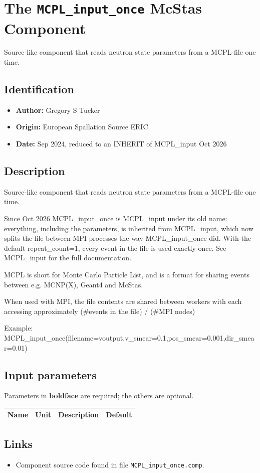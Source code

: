 \section{The \texttt{MCPL\_input\_once} McStas Component}
Source-like component that reads neutron state parameters from a MCPL-file one time.

\subsection*{Identification}
\begin{itemize}
  \item \textbf{Author:} Gregory S Tucker
  \item \textbf{Origin:} European Spallation Source ERIC
  \item \textbf{Date:} Sep 2024, reduced to an INHERIT of MCPL\_input Oct 2026
\end{itemize}

\subsection*{Description}
Source-like component that reads neutron state parameters from a MCPL-file one time.

Since Oct 2026 MCPL\_input\_once is MCPL\_input under its old name: everything, including the parameters, is inherited from MCPL\_input, which now splits the file between MPI processes the way MCPL\_input\_once did. With the default repeat\_count=1, every event in the file is used exactly once. See MCPL\_input for the full documentation.

MCPL is short for Monte Carlo Particle List, and is a format for sharing events between e.g. MCNP(X), Geant4 and McStas.

When used with MPI, the file contents are shared between workers with each accessing approximately (\#events in the file) / (\#MPI nodes)

Example: MCPL\_input\_once(filename=voutput,v\_smear=0.1,pos\_smear=0.001,dir\_smear=0.01)

\subsection*{Input parameters}
Parameters in \textbf{boldface} are required; the others are optional.

\begin{longtable}{p{}p{}p{}p{}}
\toprule
\textbf{Name} & \textbf{Unit} & \textbf{Description} & \textbf{Default} \\
\midrule
\endhead
\bottomrule
\end{longtable}

\subsection*{Links}
\begin{itemize}
  \item Component source code found in file \texttt{MCPL\_input\_once.comp}.
\end{itemize}
